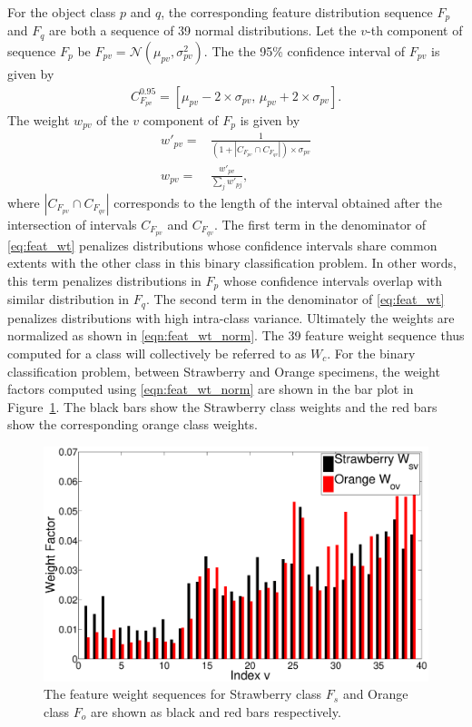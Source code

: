 \documentclass {udthesis}
\begin{document}
For the object class $p$ and $q$, the corresponding feature distribution sequence $F_p$ and $F_q$ are both a sequence of 39 normal distributions. Let the $v$-th component of sequence $F_p$ be $F_{pv}=\mathcal{N}(\mu_{pv},\sigma^2_{pv})$.
The the 95\% confidence interval of $F_{pv}$ is given by
%
\begin{align}	\label{eqn:conf_interval}
C^{0.95}_{F_{pv}}=[\mu_{pv}-2 \times \sigma_{pv},\, \mu_{pv}+2 \times \sigma_{pv}].
\end{align}
%
The weight $w_{pv}$ of the $v$ component of $F_p$ is given by
\begin{align}
 w'_{pv}= & \frac{1}{(1+ |C_{F_{pv}} \cap C_{F_{qv}}| )\times \sigma_{pv}} \label{eq:feat_wt}\\
 w_{pv}= & \frac{w'_{pv}}{\sum_{j} w'_{pj}}, \label{eqn:feat_wt_norm}
\end{align}
where $|C_{F_{pv}} \cap C_{F_{qv}}|$ corresponds to the length of the interval obtained after the intersection of intervals $C_{F_{pv}}$ and $C_{F_{qv}}$. The first term in the denominator of \eqref{eq:feat_wt} penalizes distributions whose confidence intervals share common extents with the other class in this binary classification problem. In other words, this term penalizes distributions in $F_p$ whose confidence intervals overlap with similar  distribution in $F_q$. The second term in the denominator of \eqref{eq:feat_wt} penalizes distributions with high intra-class variance. Ultimately the weights are normalized as shown in \eqref{eqn:feat_wt_norm}. The 39 feature weight sequence thus computed for a class will collectively be referred to as $W_c$. For the binary classification problem, between Strawberry and Orange specimens, the weight factors computed using \eqref{eqn:feat_wt_norm} are shown in the bar plot in Figure~\ref{fig:feat_weights}. The black bars show the Strawberry class weights and the red 
bars show the corresponding orange class weights.
%
\begin{figure}
  \centering
  \includegraphics[width=\textwidth]{feature_weights}
  \caption[Feature weights]{The feature weight sequences for Strawberry class $F_s$ and  Orange class $F_o$ are shown as black and red bars respectively.}
  \label{fig:feat_weights}
\end{figure}	
%
\end{document}
